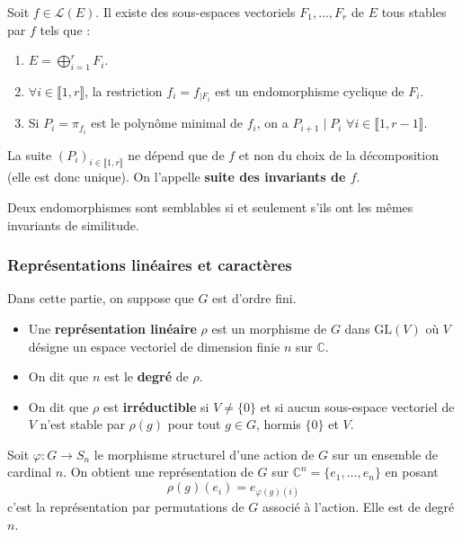   \begin{theorem}
    Soit $f \in \mathcal{L}(E)$. Il existe des sous-espaces vectoriels $F_1, \dots, F_r$ de $E$ tous stables par $f$ tels que :
    \begin{enumerate}[label={\bfseries(\roman*)}]
      \item $E = \bigoplus_{i = 1}^r F_i$.
      \item $\forall i \in \llbracket 1, r \rrbracket$, la restriction $f_i = f_{|F_i}$ est un endomorphisme cyclique de $F_i$.
      \item Si $P_i = \pi_{f_i}$ est le polynôme minimal de $f_i$, on a $P_{i+1} \mid P_i$ $\forall i \in \llbracket 1, r-1 \rrbracket$.
    \end{enumerate}
    La suite $(P_i)_{i \in \llbracket 1, r \rrbracket}$ ne dépend que de $f$ et non du choix de la décomposition (elle est donc unique). On l'appelle \textbf{suite des invariants de $f$}.
  \end{theorem}

  \begin{corollary}
    Deux endomorphismes sont semblables si et seulement s'ils ont les mêmes invariants de similitude.
  \end{corollary}

  \subsubsection{Représentations linéaires et caractères}


  Dans cette partie, on suppose que $G$ est d'ordre fini.

  \begin{definition}
    \begin{itemize}
      \item Une \textbf{représentation linéaire} $\rho$ est un morphisme de $G$ dans $\mathrm{GL}(V)$ où $V$ désigne un espace vectoriel de dimension finie $n$ sur $\mathbb{C}$.
      \item On dit que $n$ est le \textbf{degré} de $\rho$.
      \item On dit que $\rho$ est \textbf{irréductible} si $V \neq \{ 0 \}$ et si aucun sous-espace vectoriel de $V$ n'est stable par $\rho(g)$ pour tout $g \in G$, hormis $\{ 0 \}$ et $V$.
    \end{itemize}
  \end{definition}

  \begin{example}
    Soit $\varphi : G \rightarrow S_n$ le morphisme structurel d'une action de $G$ sur un ensemble de cardinal $n$. On obtient une représentation de $G$ sur $\mathbb{C}^n = \{ e_1, \dots, e_n \}$ en posant
    \[ \rho(g)(e_i) = e_{\varphi(g)(i)} \]
    c'est la représentation par permutations de $G$ associé à l'action. Elle est de degré $n$.
  \end{example}


